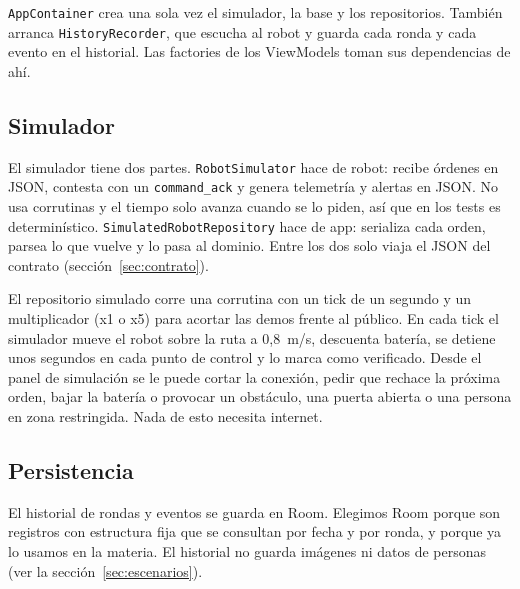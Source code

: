 \texttt{AppContainer} crea una sola vez el simulador, la base y los repositorios. También arranca \texttt{HistoryRecorder}, que escucha al robot y guarda cada ronda y cada evento en el historial. Las factories de los ViewModels toman sus dependencias de ahí.

\subsection{Simulador}

El simulador tiene dos partes. \texttt{RobotSimulator} hace de robot: recibe órdenes en JSON, contesta con un \texttt{command\_ack} y genera telemetría y alertas en JSON. No usa corrutinas y el tiempo solo avanza cuando se lo piden, así que en los tests es determinístico. \texttt{SimulatedRobotRepository} hace de app: serializa cada orden, parsea lo que vuelve y lo pasa al dominio. Entre los dos solo viaja el JSON del contrato (sección~\ref{sec:contrato}).

El repositorio simulado corre una corrutina con un tick de un segundo y un multiplicador (x1 o x5) para acortar las demos frente al público. En cada tick el simulador mueve el robot sobre la ruta a 0,8~m/s, descuenta batería, se detiene unos segundos en cada punto de control y lo marca como verificado. Desde el panel de simulación se le puede cortar la conexión, pedir que rechace la próxima orden, bajar la batería o provocar un obstáculo, una puerta abierta o una persona en zona restringida. Nada de esto necesita internet.

\subsection{Persistencia}

El historial de rondas y eventos se guarda en Room. Elegimos Room porque son registros con estructura fija que se consultan por fecha y por ronda, y porque ya lo usamos en la materia. El historial no guarda imágenes ni datos de personas (ver la sección~\ref{sec:escenarios}).
